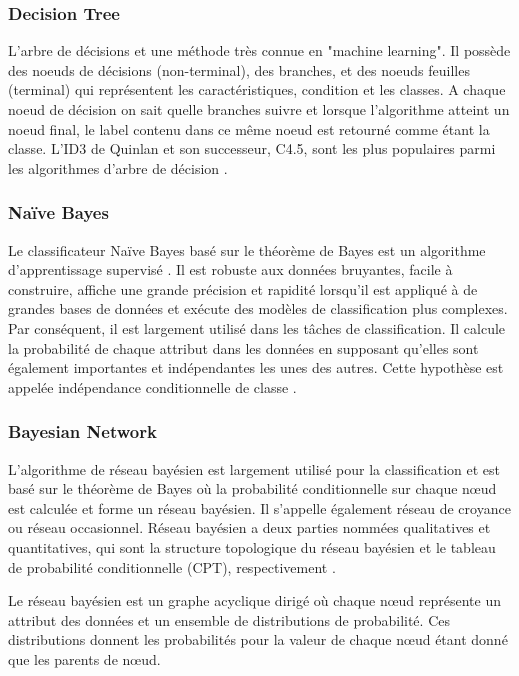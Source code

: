 \subsubsection{Decision Tree}
L'arbre de décisions et une méthode très connue en "machine learning". Il possède des noeuds de décisions (non-terminal), des branches, et des noeuds feuilles (terminal) qui représentent les caractéristiques, condition et les classes. A chaque noeud de décision on sait quelle branches suivre et lorsque l'algorithme atteint un noeud final, le label contenu dans ce même noeud est retourné comme étant la classe. 
L’ID3 de Quinlan et son successeur, C4.5, sont les plus populaires parmi les algorithmes d’arbre de décision \cite{C4_5}.

\subsubsection{Naïve Bayes}
Le classificateur Naïve Bayes \cite{Bayesian} basé sur le théorème de Bayes est un algorithme d'apprentissage supervisé \cite{DefectPred}. Il est robuste aux données bruyantes, facile à construire, affiche une grande précision et rapidité lorsqu'il est appliqué à de grandes bases de données et exécute des modèles de classification plus complexes. Par conséquent, il est largement utilisé dans les tâches de classification. Il calcule la probabilité de chaque attribut dans les données en supposant qu'elles sont également importantes et indépendantes les unes des autres. Cette hypothèse est appelée indépendance conditionnelle de classe \cite{KMean_DT} \cite{QUAIL}.

\subsubsection{Bayesian Network}

L'algorithme de réseau bayésien est largement utilisé pour la classification et est basé sur le théorème de Bayes où la probabilité conditionnelle sur chaque nœud est calculée et forme un réseau bayésien. Il s'appelle également réseau de croyance ou réseau occasionnel. Réseau bayésien a deux parties nommées qualitatives et quantitatives, qui sont la structure topologique du réseau bayésien et le tableau de probabilité conditionnelle (CPT), respectivement \cite{Bayesian01}.

Le réseau bayésien est un graphe acyclique dirigé où chaque nœud représente un attribut des données et un ensemble de distributions de probabilité. Ces distributions donnent les probabilités pour la valeur de chaque nœud étant donné que les parents de nœud.

